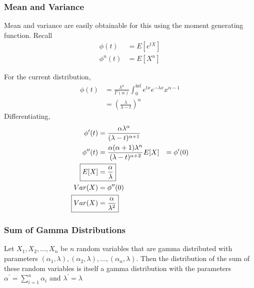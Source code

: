 \documentclass[../probability-notes.tex]{subfiles}
\begin{document}
    \subsubsection{Mean and Variance}
    Mean and variance are easily obtainable for this using the moment generating function. Recall
    \begin{align*}
        \phi(t) &= E[e^{tX}]\\
        \phi^{n}(t) &= E[X^{n}]
    \end{align*}

    For the current distribution,
    \begin{align*}
        \phi(t) &= \frac{\lambda^{\alpha}}{\Gamma(\alpha)} \int_{0}^{\inf} e^{tx} e^{-\lambda x} x^{\alpha - 1}\\
        &= (\frac{\lambda}{\lambda - t})^{\alpha}
    \end{align*}
    Differentiating,
    \begin{align*}
        \phi^{\prime}(t) &= \frac{\alpha \lambda^{\alpha}}{(\lambda - t)^{\alpha + 1}}\\
        \phi^{\prime \prime}(t) &= \frac{\alpha(\alpha + 1)\lambda^{\alpha}}{(\lambda - t)^{\alpha + 2}}
        \newline
        E[X] &= \phi^{\prime}(0)\\
        \Aboxed{E[X] &= \frac{\alpha}{\lambda}}\\
        Var(X) &= \phi^{\prime \prime}(0)\\
        \Aboxed{Var(X) &= \frac{\alpha}{\lambda^{2}}}
    \end{align*}

    \subsubsection{Sum of Gamma Distributions}
    Let $X_{1}, X_{2}, \ldots, X_{n}$ be $n$ random variables that are gamma distributed with parameters \newline$(\alpha_{1}, \lambda), (\alpha_{2}, \lambda), \ldots, (\alpha_{n}, \lambda)$. Then the distribution of the sum of these random variables is itself a gamma distribution with the parameters $\alpha^{\prime} = \sum_{i=1}^{n} \alpha_{i}$ and $\lambda^{\prime} = \lambda$
\end{document}
